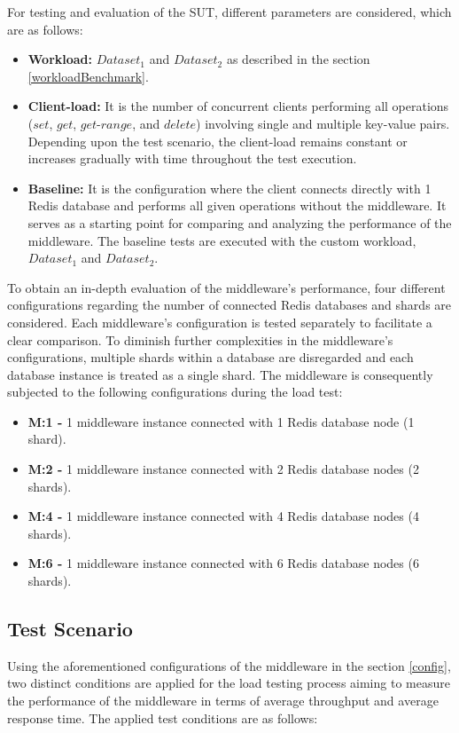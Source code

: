 \noindent For testing and evaluation of the SUT, different parameters are considered, which are as follows:
\begin{itemize}
\item \textbf{Workload:} $Dataset_{1}$ and $Dataset_{2}$ as described in the section \ref{workloadBenchmark}. 
\item \textbf{Client-load:} It is the number of concurrent clients performing all operations ($set$, $get$, $get$-$range$, and $delete$) involving single and multiple key-value pairs. Depending upon the test scenario, the client-load remains constant or increases gradually with time throughout the test execution.
\item \textbf{Baseline:} It is the configuration where the client connects directly with 1 Redis database and performs all given operations without the middleware. It serves as a starting point for comparing and analyzing the performance of the middleware. The baseline tests are executed with the custom workload, $Dataset_{1}$ and $Dataset_{2}$.
\end{itemize}

\noindent To obtain an in-depth evaluation of the middleware’s performance, four different configurations regarding the number of connected Redis databases and shards are considered. Each middleware’s configuration is tested separately to facilitate a clear comparison. To diminish further complexities in the middleware’s configurations, multiple shards within a database are disregarded and each database instance is treated as a single shard. The middleware is consequently subjected to the following configurations during the load test:
\begin{itemize}
\item \textbf{M:1 -} 1 middleware instance connected with 1 Redis database node (1 shard).
\item \textbf{M:2 -} 1 middleware instance connected with 2 Redis database nodes (2 shards).
\item \textbf{M:4 -} 1 middleware instance connected with 4 Redis database nodes (4 shards).
\item \textbf{M:6 -} 1 middleware instance connected with 6 Redis database nodes (6 shards).
\end{itemize}


\subsection{Test Scenario}
\label{testScenario}
Using the aforementioned configurations of the middleware in the section \ref{config}, two distinct conditions are applied for the load testing process aiming to measure the performance of the middleware in terms of average throughput and average response time. The applied test conditions are as follows: \\

